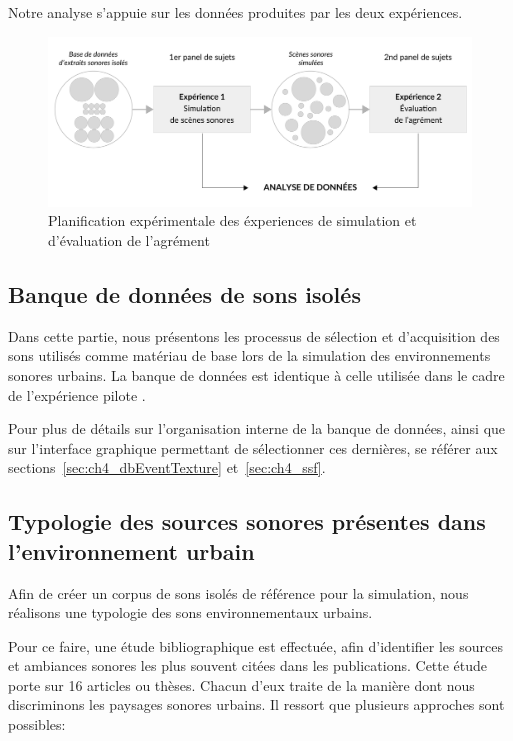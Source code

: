 Notre analyse s'appuie sur les données produites par les deux expériences.

\begin{figure}[t]
        \myfloatalign
        \includegraphics[width=.8\linewidth]{gfx/ch_5/5}
        \caption{Planification expérimentale des éxperiences de simulation et d'évaluation de l'agrément}\label{fig:xp1_2}
\end{figure}

\subsection{Banque de données de sons isolés}

Dans cette partie, nous présentons les processus de sélection et d'acquisition des sons utilisés comme matériau de base lors de la simulation des environnements sonores urbains. La banque de données est identique à celle utilisée dans le cadre de l'expérience pilote \citep{lafay2013atiam,lafay2014new}. 

Pour plus de détails sur l'organisation interne de la banque de données, ainsi que sur l'interface graphique permettant de sélectionner ces dernières, se référer aux sections~\ref{sec:ch4_dbEventTexture} et~\ref{sec:ch4_ssf}.

\subsection[Typologie des sources sonores]{Typologie des sources sonores présentes dans l'environnement urbain}

Afin de créer un corpus de sons isolés de référence pour la simulation, nous réalisons une typologie des sons environnementaux urbains. 

Pour ce faire, une étude bibliographique est effectuée, afin d'identifier les sources et ambiances sonores les plus souvent citées dans les publications. Cette étude porte sur 16 articles ou thèses. Chacun d'eux traite de la manière dont nous discriminons les paysages sonores urbains. Il ressort que plusieurs approches sont possibles:

